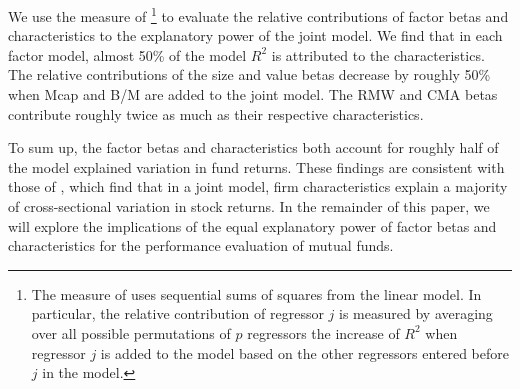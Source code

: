 We use the measure of \citet{lindeman1980introduction}\footnote{The measure of \citet{lindeman1980introduction} uses sequential sums of squares from the linear model. In particular, the relative contribution of regressor $j$ is measured by averaging over all possible permutations of $p$ regressors the increase of $R^2$ when regressor $j$ is added to the model based on the  other regressors entered before $j$ in the model.} to evaluate the relative contributions of factor betas and characteristics to the explanatory power of the joint model.  We find that in each factor model, almost 50\% of the model $R^2$ is attributed to the characteristics. The relative contributions of the size and value betas decrease by roughly 50\% when Mcap and B/M are added to the joint model. The RMW and CMA betas contribute roughly twice as much as their respective characteristics.  
\par To sum up, the factor betas and characteristics both account for roughly half of the model explained variation in fund returns. These findings are consistent with those of \citet{chordia2015cross}, which find that in a joint model, firm characteristics explain a majority of cross-sectional variation in stock returns. In the remainder of this paper, we will explore the implications of the equal explanatory power of factor betas and characteristics for the performance evaluation of mutual funds. 

